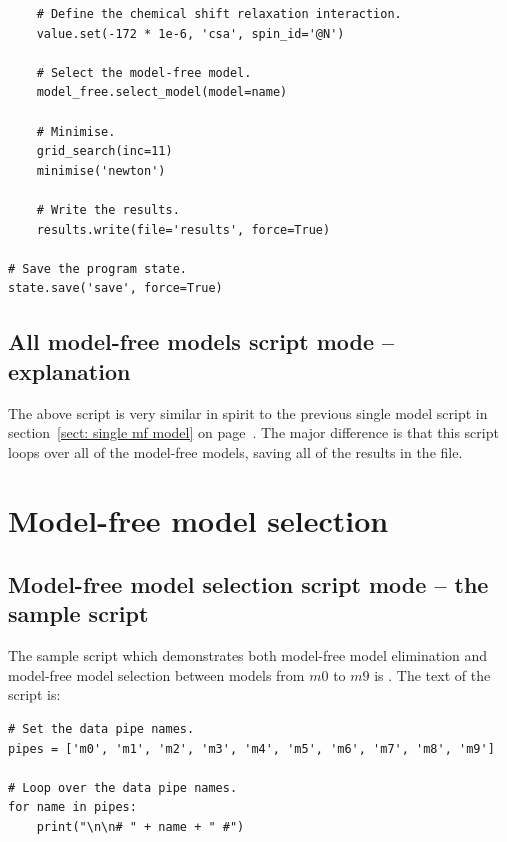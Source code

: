 \begin{htmlonly}
\begin{htmlonly}
\begin{lstlisting}
    # Define the chemical shift relaxation interaction.
    value.set(-172 * 1e-6, 'csa', spin_id='@N')
    
    # Select the model-free model.
    model_free.select_model(model=name)
    
    # Minimise.
    grid_search(inc=11)
    minimise('newton')
    
    # Write the results.
    results.write(file='results', force=True)

# Save the program state.
state.save('save', force=True)
\end{lstlisting}



\subsection{All model-free models script mode -- explanation}

The above script is very similar in spirit to the previous single model script in section~\ref{sect: single mf model} on page~\pageref{sect: single mf model}.  The major difference is that this script loops over all of the model-free models, saving all of the results in the  file.




\section{Model-free model selection}



\subsection{Model-free model selection script mode -- the sample script}

The sample script which demonstrates both model-free model elimination and model-free model selection between models from $m0$ to $m9$ is .  The text of the script is:

\begin{lstlisting}
# Set the data pipe names.
pipes = ['m0', 'm1', 'm2', 'm3', 'm4', 'm5', 'm6', 'm7', 'm8', 'm9']

# Loop over the data pipe names.
for name in pipes:
    print("\n\n# " + name + " #")
    

\end{lstlisting}
\end{htmlonly}
\end{htmlonly}
